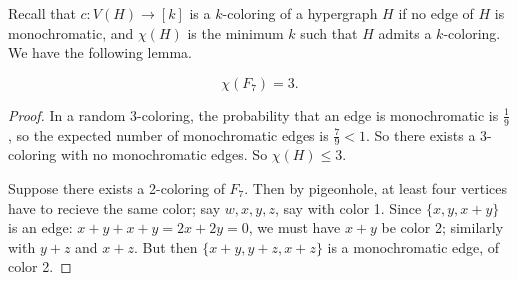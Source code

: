 Recall that $c: V(H)\to [k]$ is a $k$-coloring of a hypergraph $H$ if no edge of $H$ is monochromatic, and $\chi(H)$ is the minimum $k$ such that $H$ admits a $k$-coloring. We have the following lemma.
\begin{lemma} \label{lem:chiF7}
\[	
\chi(F_7) = 3.
\]
\end{lemma}
\begin{proof}	
In a random $3$-coloring, the probability that an edge is monochromatic is $\frac{1}{9}$, so the expected number of monochromatic edges is $\frac{7}{9}<1$. So there exists a 3-coloring with no monochromatic edges. So $\chi(H) \leq 3$.

Suppose there exists a 2-coloring of $F_7$. Then by pigeonhole, at least four vertices have to recieve the same color; say $w,x,y,z$, say with color 1. Since $\{x,y,x+y\}$ is an edge: $x+y+x+y = 2x+2y = 0$, we must have $x+y$ be color 2; similarly with $y+z$ and $x+z$. But then $\{x+y,y+z,x+z\}$ is a monochromatic edge, of color 2.
\end{proof}

